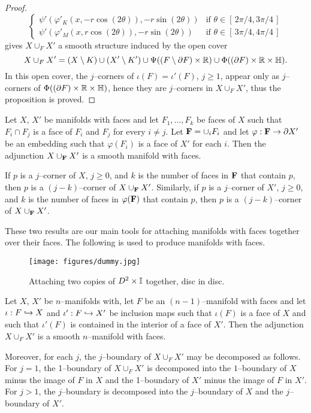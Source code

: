 \begin{proof}
\[\begin{cases}
			\psi'(\varphi'_K(x,-r\cos(2\theta)),-r\sin(2\theta))				
				&	\mbox{if } \theta\in[\,2\pi/4,3\pi/4\,]	\\
			\psi'(\varphi'_M(x,r\cos(2\theta)),-r\sin(2\theta))				
				&	\mbox{if } \theta\in[\,3\pi/4,4\pi/4\,]
		\end{cases}	
	\]
	gives $X\cup_F X'$ a smooth structure induced by the open cover
	\[
		X\cup_F X'=(X\setminus K)\cup(X'\setminus K')\cup\Psi((F\setminus\partial F)\times\mathbb{R})\cup	\Phi((\partial F)\times\mathbb{R}\times\mathbb{H}).
	\]
	In this open cover, the $j$--corners of $\iota(F)=\iota'(F)$, $j\geq 1$, appear only as $j$--corners of $\Phi((\partial F)\times\mathbb{R}\times\mathbb{H})$, hence they are $j$--corners in $X\cup_F X'$, thus the proposition is proved.
\end{proof}

\begin{cor}
	\label{cor:addfaces}
	Let $X$, $X'$ be manifolds with faces and let $F_1,\dots, F_k$ be faces of $X$ such that $F_i\cap F_j$ is a face of $F_i$ and $F_j$ for every $i\neq j$.
	Let ${\bf F}=\cup_i F_i$ and let $\varphi:{\bf F}\to \partial X'$ be an embedding such that $\varphi(F_i)$ is a face of $X'$ for each $i$.
	Then the adjunction $X \cup_{\bf F} X'$ is a smooth manifold with faces.
		
	If $p$ is a $j$--corner of $X$, $j\geq 0$, and $k$ is the number of faces in ${\bf F}$ that contain $p$, then $p$ is a $(j-k)$--corner of $X\cup_{\bf F} X'$.
	Similarly, if $p$ is a $j$--corner of $X'$, $j\geq 0$, and $k$ is the number of faces in $\varphi({\bf F})$ that contain $p$, then $p$ is a $(j-k)$--corner of $X\cup_{\bf F} X'$.
\end{cor}

These two results are our main tools for attaching manifolds with faces together over their faces.
The following is used to produce manifolds with faces.

\begin{figure}[H]
	\centering
	\caption{Attaching two copies of $D^2\times\mathbb{I}$ together, disc in disc.}
	\texttt{[image: figures/dummy.jpg]}
	\label{fig:cyloncyl}
\end{figure}

\begin{prop}
	\label{prop:attachingManifoldsFaceUInterior}
	Let $X$, $X'$ be $n$--manifolds with, let $F$ be an $(n-1)$--manifold with faces and let $\iota:F\hookrightarrow X$ and $\iota':F\hookrightarrow X'$ be inclusion maps such that $\iota(F)$ is a face of $X$ and such that $\iota'(F)$ is contained in the interior of a face of $X'$.
	Then the adjunction $X\cup_F X'$ is a smooth $n$--manifold with faces.
	
	Moreover, for each $j$, the $j$--boundary of $X\cup_F X'$ may be decomposed as follows.
	For $j=1$, the 1--boundary of $X\cup_F X'$ is decomposed into the $1$--boundary of $X$ minus the image of $F$ in $X$ and the 1--boundary of $X'$ minus the image of $F$ in $X'$.
	For $j>1$, the $j$--boundary is  decomposed into the $j$--boundary of $X$ and the $j$--boundary of $X'$.
\end{prop}

